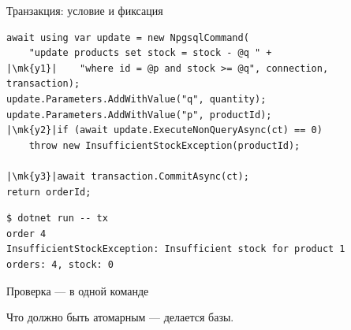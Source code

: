 \documentclass[aspectratio=169,10pt,t]{beamer}
\newcommand{\codexs}{\ttfamily\fontsize{7.0}{8.3}\selectfont}
\newcommand{\termsm}{\ttfamily\fontsize{6.6}{7.9}\selectfont}
\newcommand{\mk}[1]{\tikz[remember picture,overlay]\coordinate (#1) at (0,0.55ex);}
\begin{document}
\begin{frame}[fragile]{Транзакция: условие и фиксация}
  \vspace{0.3em}
\begin{lstlisting}[style=csharp,basicstyle=\codexs,escapechar=|]
await using var update = new NpgsqlCommand(
    "update products set stock = stock - @q " +
|\mk{y1}|    "where id = @p and stock >= @q", connection, transaction);
update.Parameters.AddWithValue("q", quantity);
update.Parameters.AddWithValue("p", productId);
|\mk{y2}|if (await update.ExecuteNonQueryAsync(ct) == 0)
    throw new InsufficientStockException(productId);

|\mk{y3}|await transaction.CommitAsync(ct);
return orderId;
\end{lstlisting}
  \vspace{-1.2em}

\begin{lstlisting}[style=term,basicstyle=\termsm]
$ dotnet run -- tx
order 4
InsufficientStockException: Insufficient stock for product 1
orders: 4, stock: 0
\end{lstlisting}

\end{frame}

\begin{frame}{Проверка --- в одной команде}
  \slidetop

  \slidegap
  {\large Что должно быть атомарным --- делается  базы.}
\end{frame}
\end{document}
